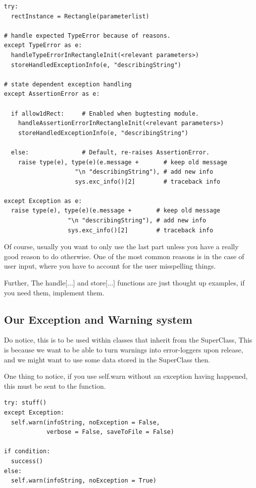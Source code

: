 \documentclass[10pt,a4paper]{article}
\begin{document}
\begin{lstlisting}
try: 
  rectInstance = Rectangle(parameterlist)

# handle expected TypeError because of reasons.
except TypeError as e:  
  handleTypeErrorInRectangleInit(<relevant parameters>)
  storeHandledExceptionInfo(e, "describingString")
  
# state dependent exception handling
except AssertionError as e: 

  if allow1dRect:     # Enabled when bugtesting module. 
    handleAssertionErrorInRectangleInit(<relevant parameters>)
    storeHandledExceptionInfo(e, "describingString")

  else:               # Default, re-raises AssertionError.
    raise type(e), type(e)(e.message +       # keep old message
                    "\n "describingString"), # add new info
                    sys.exc_info()[2]        # traceback info
  
except Exception as e: 
  raise type(e), type(e)(e.message +       # keep old message
                  "\n "describingString"), # add new info
                  sys.exc_info()[2]        # traceback info
\end{lstlisting}
Of course, usually you want to only use the last part unless you have a really good reason to do otherwise. One of the most common reasons is in the case of user input, where you have to account for the user misspelling things.

Further, The handle[...] and store[...] functions are just thought up examples, if you need them, implement them.

\newpage
\subsection{Our Exception and Warning system}

Do notice, this is to be used within classes that inherit from the SuperClass, 
This is because we want to be able to turn warnings into error-loggers upon release, 
and we might want to use some data stored in the SuperClass then. 

One thing to notice, if you use self.warn without an exception having happened, this 
must be sent to the function.

\begin{lstlisting}
try: stuff()
except Exception:
  self.warn(infoString, noException = False, 
            verbose = False, saveToFile = False)

if condition: 
  success()
else: 
  self.warn(infoString, noException = True)

\end{lstlisting}
\end{document}
